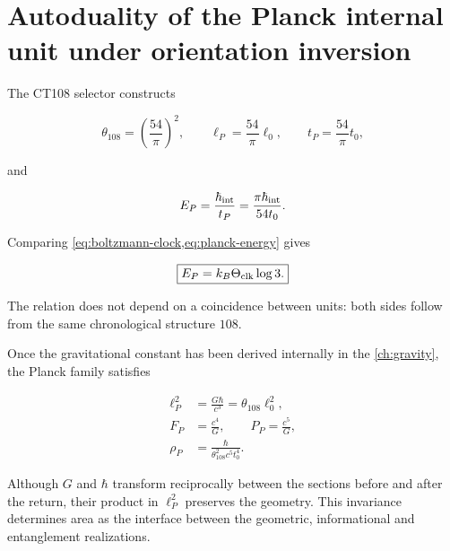 \section{Autoduality of the Planck internal unit under orientation inversion}

The CT108 selector constructs

\begin{equation}
\theta_{108}=\left(\frac{54}{\pi}\right)^2,
\qquad
\ell_P=\frac{54}{\pi}\ell_0,
\qquad
t_P=\frac{54}{\pi}t_0,
\label{eq:planck-length-time}
\end{equation}

and

\begin{equation}
E_P=\frac{\hbar_{\rm int}}{t_P}
=\frac{\pi\hbar_{\rm int}}{54t_0}.
\label{eq:planck-energy}
\end{equation}

Comparing \cref{eq:boltzmann-clock,eq:planck-energy} gives

\begin{equation}
\boxed{E_P=k_B\Theta_{\rm clk}\log3.}
\label{eq:planck-trit}
\end{equation}

The relation does not depend on a coincidence between units: both sides
follow from the same chronological structure \(108\).

Once the gravitational constant has been derived internally in the
\cref{ch:gravity}, the Planck family satisfies

\begin{align}
\ell_P^2&=\frac{G\hbar}{c^3}=\theta_{108}\ell_0^2,
\label{eq:planck-area}\\
F_P&=\frac{c^4}{G},
\qquad
P_P=\frac{c^5}{G},
\label{eq:planck-force-power}\\
\rho_P&=\frac{\hbar}{\theta_{108}^2c^5t_0^4}.
\label{eq:planck-density}
\end{align}

Although \(G\) and \(\hbar\) transform reciprocally between the sections
before and after the return, their product in \(\ell_P^2\) preserves the
geometry. This invariance determines area as the interface between the
geometric, informational and entanglement realizations.
